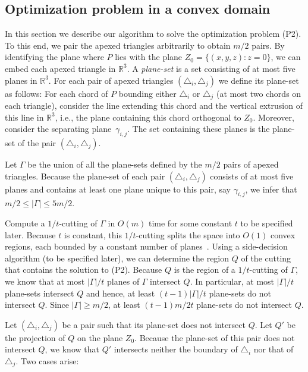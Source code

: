 \documentclass[a4paper,UKenglish]{lipics}
\newcommand{\reg}{\ensuremath{R'}}
\begin{document}
\subsection{Optimization problem in a convex domain}
In this section we describe our algorithm to solve the optimization problem (P2). 
To this end, we pair the apexed triangles arbitrarily to obtain $m/2$ pairs.
By identifying the plane where $P$ lies with the plane $Z_0 = \{(x,y,z): z = 0\}$, we can embed each apexed triangle in $\mathbb{R}^3$.
A \emph{plane-set} is a set consisting of at most five planes in $\mathbb{R}^3$.
For each pair of apexed triangles $(\triangle_i, \triangle_j)$ we define its plane-set as follows: 
For each chord of $P$ bounding either $\triangle_i$ or $\triangle_j$ (at most two chords on each triangle), consider the line extending this chord and the vertical extrusion of this line in $\mathbb{R}^3$, i.e., the plane containing this chord orthogonal to $Z_0$. Moreover, consider the separating plane~$\gamma_{i,j}$. The set containing these planes is the plane-set of the pair $(\triangle_i, \triangle_j)$.

Let $\Gamma$ be the union of all the plane-sets defined by the $m/2$ pairs of apexed triangles. 
Because the plane-set of each pair $(\triangle_i, \triangle_j)$ consists of at most five planes and contains at least one plane unique to this pair, say $\gamma_{i,j}$, we infer that $m/2\leq |\Gamma| \leq 5m/2$.

Compute a $1/t$-cutting of $\Gamma$ in $O(m)$ time for some constant $t$ to be specified later.
Because $t$ is constant, this $1/t$-cutting splits the space into $O(1)$ convex regions, each bounded by a constant number of planes~\cite{matousekCuttings}. 
Using a side-decision algorithm (to be specified later), we can determine the region $Q$ of the cutting that contains the solution to (P2). Because $Q$ is the region of a $1/t$-cutting of $\Gamma$, we know that at most $|\Gamma|/t$ planes of $\Gamma$ intersect $Q$. 
In particular, at most $|\Gamma|/t$ plane-sets intersect $Q$ and hence, at least $(t-1)|\Gamma|/t$ plane-sets do not intersect $Q$. 
Since $|\Gamma| \geq m/2$, at least $(t-1)m/2t$ plane-sets do not intersect $Q$.

Let $(\triangle_i, \triangle_j)$ be a pair such that its plane-set does not intersect $Q$. 
Let $Q'$ be the projection of $Q$ on the plane $Z_0$. Because the plane-set of this pair does not intersect $Q$, we know that $Q'$ intersects neither the boundary of $\triangle_i$ nor that of $\triangle_j$.
Two cases arise:
\end{document}
